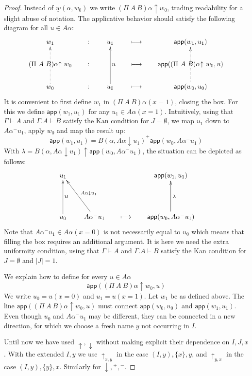 \documentclass[10pt,a4paper]{article}
\newcommand{\app}{\mathsf{app}}
\newcommand{\set}[1]{\{#1\}}
\newcommand{\es}{\emptyset}
\newcommand{\lto}{\longmapsto}
\newcommand{\rup}[1]{#1{\uparrow}}
\newcommand{\rdo}[1]{#1{\downarrow}}
\newcommand{\rupxy}[1]{#1{\uparrow_{x,y}}}
\newcommand{\rupyx}[1]{#1{\uparrow_{y,x}}}
\newcommand{\del}[1]{}
\newcommand{\ul}[1]{\underline{#1}}
\begin{document}
\begin{proof}
  Instead of $\ul{w}(\alpha,w_0)$ we write $\rup{(\Pi~A~B)\alpha}
  w_0$, trading readability for a slight abuse of notation.  The
  applicative behavior should satisfy the following diagram for all
  $u\in A\alpha$:
  \[
  \xymatrix@R=.6cm@C=.6cm{
    w_1                                         &:&   u_1\del{\in A\alpha(x=1)}             &\lto &   \app(w_1,u_1)\del{\in B(\alpha(x=1),u_1)}  \\
    \rup{(\Pi~A~B)\alpha}~w_0 &:&    ~~~u\del{\in A\alpha}                  &\lto &    \app(\rup{(\Pi~A~B)\alpha}~w_0,u)\del{\in B(\alpha,u)}   \\
    w_0\ar@{.>}[uu]                   &:&    u_0\del{\in A\alpha(x=0)}\ar[uu] &\lto &    \app(w_0,u_0)\del{\in B(\alpha(x=0),u_0)}\ar@{.>}[uu]   \\
  }
  \]
  It is convenient to first define $w_1$ in $(\Pi~A~B)\alpha(x=1)$,
  closing the box.  For this we define $\app(w_1,u_1)$ for any $u_1\in
  A\alpha(x=1)$.  Intuitively, using that $\Gamma\vdash A$ and
  $\Gamma.A\vdash B$ satisfy the Kan condition for $J=\es$, we map
  $u_1$ down to $A\alpha^- u_1$, apply $w_0$ and map the result up:
  $$
  \app(w_1,u_1) = B(\alpha,\rdo{A\alpha}u_1)^+\app(w_0,A\alpha^- u_1)
  $$
  With $\lambda=\rup{B(\alpha,\rdo{A\alpha}u_1)} \app(w_0,A\alpha^-
  u_1)$, the situation can be depicted as follows:
  \[
  \xymatrix@R=.6cm@C=.6cm{
    u_1            && &   \app(w_1,u_1)  \\
    ~~~u               && &    \\
    u_0\ar[uu]      &A\alpha^- u_1\ar[uul]_{\rdo{A\alpha}u_1}&\lto &    \app(w_0,A\alpha^- u_1)\ar[uu]_\lambda  \\
  }
  \]
  Note that $A\alpha^- u_1 \in A\alpha(x=0)$ is not necessarily equal
  to $u_0$ which means that filling the box requires an additional
  argument.  It is here we need the extra uniformity condition, using
  that $\Gamma\vdash A$ and $\Gamma.A\vdash B$ satisfy the Kan
  condition for $J=\es$ and $|J|=1$.

  We explain how to define for every $u\in A\alpha$
  $$
  \app(\rup{(\Pi~A~B)\alpha} w_0,u)
  $$
  We write $u_0 = u(x=0)$ and $u_1 = u(x=1)$.  Let $w_1$ be as defined
  above.  The line $\app((\Pi~A~B)\alpha\uparrow w_0,u)$ must connect
  $\app(w_0,u_0)$ and $\app(w_1,u_1)$.  Even though $u_0$ and
  $A\alpha^- u_1$ may be different, they can be connected in a new
  direction, for which we choose a fresh name $y$ not occurring in
  $I$.

  Until now we have used $\rup{},\rdo{}$ without making explicit their
  dependence on $I,J,x$. With the extended $I,y$ we use $\rupxy{}$ in
  the case $(I,y),\set{x},y$, and $\rupyx{}$ in the case
  $(I,y),\set{y},x$. Similarly for $\rdo{},{}^+,{}^-$.


\end{proof}
\end{document}
